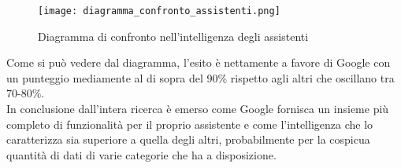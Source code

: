 \begin{figure}[htbp]
	\begin{center}
		\texttt{[image: diagramma\_confronto\_assistenti.png]}
		\caption{Diagramma di confronto nell'intelligenza degli assistenti}
	\end{center}
\end{figure}


Come si può vedere dal diagramma, l'esito è nettamente a favore di Google con un punteggio mediamente al di sopra del 90\% rispetto agli altri che oscillano tra 70-80\%. \\
In conclusione dall'intera ricerca è emerso come Google fornisca un insieme più completo di funzionalità per il proprio assistente e come l'intelligenza che lo caratterizza sia superiore a quella degli altri, probabilmente per la cospicua quantità di dati di varie categorie che ha a disposizione. 
